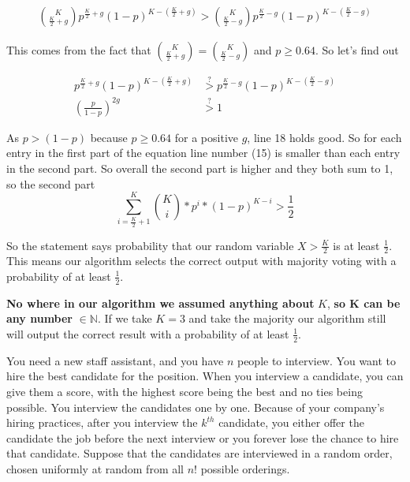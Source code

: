 \documentclass[addpoints,12pt]{exam}
\begin{document}
\begin{questions}
\begin{solution}
            \begin{align}
                \binom{K}{\frac{K}{2} + g} p^{\frac{K}{2} + g} (1-p)^{K - (\frac{K}{2} + g)} > \binom{K}{\frac{K}{2} - g} p^{\frac{K}{2} - g} (1-p)^{K - (\frac{K}{2} - g)}
            \end{align}

            This comes from the fact that $\binom{K}{\frac{K}{2} + g} = \binom{K}{\frac{K}{2} - g}$ and $p \geq 0.64$. So let's find out

            \begin{align}
                p^{\frac{K}{2} + g} (1-p)^{K - (\frac{K}{2} + g)} &\stackrel{?}{>} p^{\frac{K}{2} - g} (1-p)^{K - (\frac{K}{2} - g)}\\
                \left(\frac{p}{1-p}\right)^{2g} &\stackrel{?}{>} 1
            \end{align}

            As $p > (1-p)$ because $p \geq 0.64$ for a positive $g$, line 18 holds good. So for each entry in the first part of the equation line number (15) is smaller than each entry in the second part. So overall the second part is higher and they both sum to 1, so the second part $$\displaystyle\sum_{i=\frac{K}{2} + 1} ^{K}\binom{K}{i} * p^i * (1 - p)^{K - i} > \frac{1}{2}$$

            So the statement says probability that our random variable $X > \frac{K}{2}$ is at least $\frac{1}{2}$. This means our algorithm selects the correct output with majority voting with a probability of at least $\frac{1}{2}$.

            \textbf{No where in our algorithm we assumed anything about} $K$, \textbf{so K can be any number} $\in \mathbb{N}$. If we take $K = 3$ and take the majority our algorithm still will output the correct result with a probability of at least $\frac{1}{2}$.
            
		\end{solution}
  
		\question You need a new staff assistant, and you have $n$ people to interview. You want to hire the best candidate for the position. When you interview a candidate, you can give them a score, with the highest score being the best and no ties being possible. You interview the candidates one by one. Because of your company’s hiring practices, after you interview the $k^{th}$ candidate, you either offer the candidate the job before the next interview or you forever lose the chance to hire that candidate. Suppose that the candidates are interviewed in a random order, chosen uniformly at random from all $n!$ possible orderings.
		

\end{questions}
\end{document}
